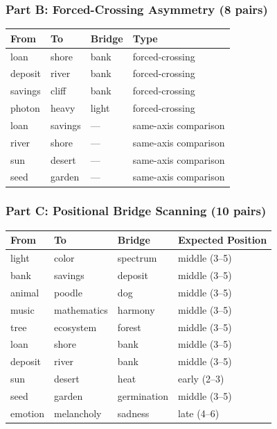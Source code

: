 \subsubsection{Part B: Forced-Crossing Asymmetry (8 pairs)}\label{part-b-forced-crossing-asymmetry-8-pairs}

\begin{longtable}[]{@{}llll@{}}
\toprule\noalign{}
From & To & Bridge & Type \\
\midrule\noalign{}
\endhead
\bottomrule\noalign{}
\endlastfoot
loan & shore & bank & forced-crossing \\
deposit & river & bank & forced-crossing \\
savings & cliff & bank & forced-crossing \\
photon & heavy & light & forced-crossing \\
loan & savings & --- & same-axis comparison \\
river & shore & --- & same-axis comparison \\
sun & desert & --- & same-axis comparison \\
seed & garden & --- & same-axis comparison \\
\end{longtable}

\subsubsection{Part C: Positional Bridge Scanning (10 pairs)}\label{part-c-positional-bridge-scanning-10-pairs}

\begin{longtable}[]{@{}llll@{}}
\toprule\noalign{}
From & To & Bridge & Expected Position \\
\midrule\noalign{}
\endhead
\bottomrule\noalign{}
\endlastfoot
light & color & spectrum & middle (3--5) \\
bank & savings & deposit & middle (3--5) \\
animal & poodle & dog & middle (3--5) \\
music & mathematics & harmony & middle (3--5) \\
tree & ecosystem & forest & middle (3--5) \\
loan & shore & bank & middle (3--5) \\
deposit & river & bank & middle (3--5) \\
sun & desert & heat & early (2--3) \\
seed & garden & germination & middle (3--5) \\
emotion & melancholy & sadness & late (4--6) \\
\end{longtable}


